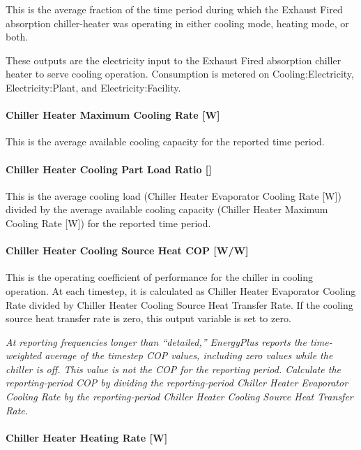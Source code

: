 This is the average fraction of the time period during which the Exhaust Fired absorption chiller-heater was operating in either cooling mode, heating mode, or both.

These outputs are the electricity input to the Exhaust Fired absorption chiller heater to serve cooling operation. Consumption is metered on Cooling:Electricity, Electricity:Plant, and Electricity:Facility.

\paragraph{Chiller Heater Maximum Cooling Rate {[}W{]}}\label{chiller-heater-maximum-cooling-rate-w}

This is the average available cooling capacity for the reported time period.

\paragraph{Chiller Heater Cooling Part Load Ratio {[]}}\label{chiller-heater-cooling-part-load-ratio-1}

This is the average cooling load (Chiller Heater Evaporator Cooling Rate {[}W{]}) divided by the average available cooling capacity (Chiller Heater Maximum Cooling Rate {[}W{]}) for the reported time period.

\paragraph{Chiller Heater Cooling Source Heat COP {[}W/W{]}}\label{chiller-heater-cooling-source-heat-cop-ww}

This is the operating coefficient of performance for the chiller in cooling operation. At each timestep, it is calculated as Chiller Heater Evaporator Cooling Rate divided by Chiller Heater Cooling Source Heat Transfer Rate. If the cooling source heat transfer rate is zero, this output variable is set to zero.

\emph{At reporting frequencies longer than ``detailed,'' EnergyPlus reports the time-weighted average of the timestep COP values, including zero values while the chiller is off. This value is not the COP for the reporting period. Calculate the reporting-period COP by dividing the reporting-period Chiller Heater Evaporator Cooling Rate by the reporting-period Chiller Heater Cooling Source Heat Transfer Rate.}

\paragraph{Chiller Heater Heating Rate {[}W{]}}\label{chiller-heater-heating-rate-w-2}

